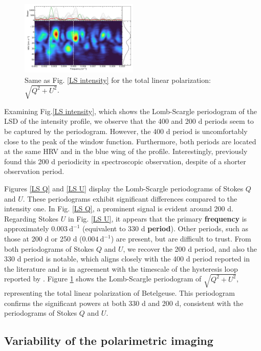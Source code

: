 \documentclass{aa}
\begin{document}
\begin{figure}[!h]
    \centering
    \includegraphics[width=0.5\textwidth]{Lomb-Scargle linear polarization.pdf}
    \caption{Same as Fig. \ref{LS intensity} for the total linear polarization: $\sqrt{Q^2+U^2}$.}
    \label{LS linear polarization}
\end{figure}


Examining Fig.\ref{LS intensity}, which shows the Lomb-Scargle periodogram of the LSD of the intensity profile, we observe that the 400 and 200 d periods seem to be captured by the periodogram. However, the 400 d period is uncomfortably close to the peak of the window function. Furthermore, both periods are located at the same HRV and in the blue wing of the profile. Interestingly, \cite{mathias_evolution_2018} previously found this 200 d periodicity in spectroscopic observation, despite of a shorter observation period. 



Figures \ref{LS Q} and \ref{LS U} display the Lomb-Scargle periodograms of Stokes $Q$ and $U$. These periodograms exhibit significant differences compared to the intensity one. In Fig. \ref{LS Q}, a prominent signal is evident around 200 d. Regarding Stokes $U$ in Fig. \ref{LS U}, it appears that the primary \textbf{frequency} is approximately $0.003 \ \mathrm{d^{-1}}$ (equivalent to 330 d \textbf{period}). Other periods, such as those at 200 d or 250 d ($0.004 \ \mathrm{d^{-1}}$) are present, but are difficult to trust. From both periodograms of Stokes $Q$ and $U$, we recover the 200 d period, and also the 330 d period is notable, which aligns closely with the 400 d period reported in the literature and is in agreement with the timescale of the hysteresis loop reported by \cite{kravchenko_tomography_2019}.  
Figure \ref{LS linear polarization} shows the Lomb-Scargle periodogram of $\sqrt{Q^2+U^2}$, representing the total linear polarization of Betelgeuse. 
This periodogram confirms the significant powers at both 330 d and 200 d, consistent with the periodograms of Stokes $Q$ and $U$. 


\subsection{Variability of the polarimetric imaging}
\end{document}
